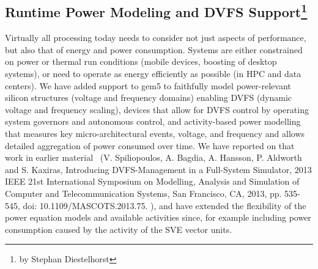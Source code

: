 \subsection[Runtime Power Modeling and DVFS Support]{Runtime Power Modeling and DVFS Support\footnote{by Stephan Diestelhorst}}

Virtually all processing today needs to consider not just aspects of performance, but also that of energy and power consumption. Systems are either constrained on power or thermal run conditions (mobile devices, boosting of desktop systems), or need to operate as energy efficiently as possible (in HPC and data centers).
We have added support to gem5 to faithfully model power-relevant silicon structures (voltage and frequency domains) enabling DVFS (dynamic voltage and frequency scaling), devices that allow for DVFS control by operating system governors and autonomous control, and activity-based power modelling that measures key micro-architectural events, voltage, and frequency and allows detailed aggregation of power consumed over time.
We have reported on that work in earlier material~\cite{} (V. Spiliopoulos, A. Bagdia, A. Hansson, P. Aldworth and S. Kaxiras, Introducing DVFS-Management in a Full-System Simulator, 2013 IEEE 21st International Symposium on Modelling, Analysis and Simulation of Computer and Telecommunication Systems, San Francisco, CA, 2013, pp. 535-545, doi: 10.1109/MASCOTS.2013.75.
), and have extended the flexibility of the power equation models and available activities since, for example including power consumption caused by the activity of the SVE vector units.

